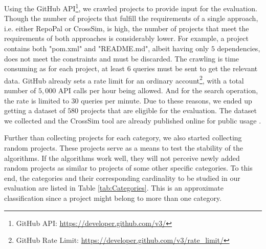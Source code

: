 Using the GitHub API\footnote{GitHub API: \url{https://developer.github.com/v3/}}, we crawled projects to provide input for the evaluation. Though the number of projects that fulfill the requirements of a single approach, i.e. either RepoPal or CrossSim, is high, the number of projects that meet the requirements of both approaches is considerably lower. For example, a project contains both "pom.xml" and "README.md", albeit having only $5$ dependencies, does not meet the constraints and must be discarded. The crawling is time consuming as for each project, at least $6$ queries must be sent to get the relevant data. GitHub already sets a rate limit for an ordinary account\footnote{GitHub Rate Limit: \url{https://developer.github.com/v3/rate_limit/}}, with a total number of $5,000$ API calls per hour being allowed. And for the search operation, the rate is limited to $30$ queries per minute. Due to these reasons, we ended up getting a dataset of $580$ projects that are eligible for the evaluation. The dataset we collected and the CrossSim tool are already published online for public usage \cite{CROSSSIM-DATA}.




Further than collecting projects for each category, we also started collecting random projects. These projects serve as a means to test the stability of the algorithms. If the algorithms work well, they will not perceive newly added random projects as similar to projects of some other specific categories. To this end, the categories and their corresponding cardinality to be studied in our evaluation are listed in Table \ref{tab:Categories}. This is an approximate classification since a project might belong to more than one category.

